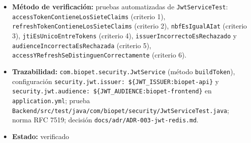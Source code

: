 \documentclass[
  spanish,
]{article}
\providecommand{\tightlist}{%
  \setlength{\itemsep}{0pt}\setlength{\parskip}{0pt}}
\begin{document}
\begin{itemize}
  \begin{enumerate}
  \def\labelenumi{\arabic{enumi}.}
  \tightlist
  \item
    Un access token emitido contiene los siete claims enumerados.
  \item
    Un refresh token emitido contiene los siete claims enumerados.
  \item
    El valor de \texttt{nbf} es igual al de \texttt{iat}.
  \item
    El valor de \texttt{jti} es distinto entre dos tokens emitidos
    consecutivamente.
  \item
    Un token cuyo \texttt{iss} no coincide con el configurado es
    rechazado; lo mismo para \texttt{aud}.
  \item
    Access token y refresh token se distinguen entre sí de forma
    inequívoca.
  \end{enumerate}
\item
  \textbf{Método de verificación:} pruebas automatizadas de
  \texttt{Jwt\allowbreak{}Service\allowbreak{}Test}: \texttt{access\allowbreak{}Token\allowbreak{}Contiene\allowbreak{}Los\allowbreak{}Siete\allowbreak{}Claims}
  (criterio 1), \texttt{refresh\allowbreak{}Token\allowbreak{}Contiene\allowbreak{}Los\allowbreak{}Siete\allowbreak{}Claims} (criterio
  2), \texttt{nbf\allowbreak{}Es\allowbreak{}Igual\allowbreak{}AIat} (criterio 3),
  \texttt{jti\allowbreak{}Es\allowbreak{}Unico\allowbreak{}Entre\allowbreak{}Tokens} (criterio 4),
  \texttt{issuer\allowbreak{}Incorrecto\allowbreak{}Es\allowbreak{}Rechazado} y
  \texttt{audience\allowbreak{}Incorrecta\allowbreak{}Es\allowbreak{}Rechazada} (criterio 5),
  \texttt{access\allowbreak{}YRefresh\allowbreak{}Se\allowbreak{}Distinguen\allowbreak{}Correctamente} (criterio 6).
\item
  \textbf{Trazabilidad:} \texttt{com.\allowbreak{}biopet.\allowbreak{}security.\allowbreak{}Jwt\allowbreak{}Service} (método
  \texttt{build\allowbreak{}Token}), configuración
  \texttt{security.\allowbreak{}jwt.\allowbreak{}issuer:\ \$\{JWT\_\allowbreak{}ISSUER:\allowbreak{}biopet-\allowbreak{}api\}} y
  \texttt{security.\allowbreak{}jwt.\allowbreak{}audience:\ \$\{JWT\_\allowbreak{}AUDI\allowbreak{}ENCE:biopet-\allowbreak{}frontend\}}
  en \texttt{application.\allowbreak{}yml}; prueba
  \texttt{Backend/\allowbreak{}src/\allowbreak{}test/\allowbreak{}java/\allowbreak{}com/\allowbreak{}biopet/\allowbreak{}security/\allowbreak{}Jwt\allowbreak{}Service\allowbreak{}Test.\allowbreak{}java};
  norma RFC 7519; decisión \texttt{docs/\allowbreak{}adr/\allowbreak{}ADR-\allowbreak{}003-\allowbreak{}jwt-\allowbreak{}redis.\allowbreak{}md}.
\item
  \textbf{Estado:} verificado
\end{itemize}
\end{document}
